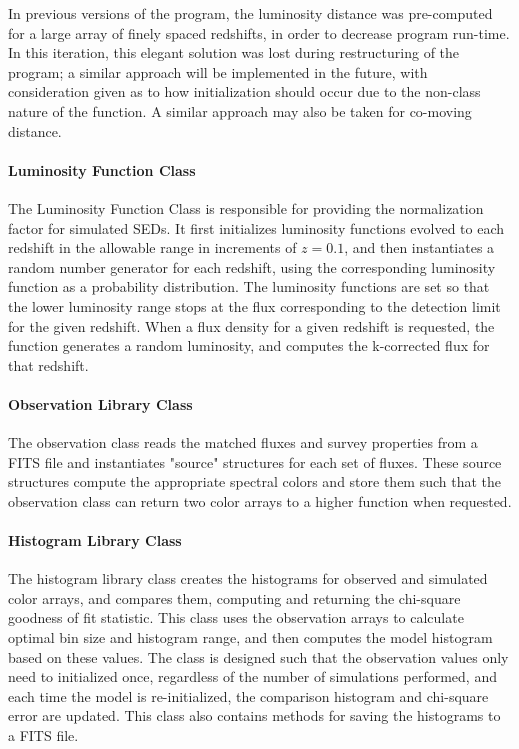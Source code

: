 \documentclass[twocolumn,letterpaper,10pt]{article}
\begin{document}
In previous versions of the program, the luminosity distance was pre-computed for a large array of finely spaced redshifts, in order to decrease program run-time. In this iteration, this elegant solution was lost during restructuring of the program; a similar approach will be implemented in the future, with consideration given as to how initialization should occur due to the non-class nature of the function. A similar approach may also be taken for co-moving distance.

\paragraph{Luminosity Function Class}
The Luminosity Function Class is responsible for providing the normalization factor for simulated SEDs. It first initializes luminosity functions evolved to each redshift in the allowable range in increments of $z=0.1$, and then instantiates a random number generator for each redshift, using the corresponding luminosity function as a probability distribution. The luminosity functions are set so that the lower luminosity range stops at the flux corresponding to the detection limit for the given redshift. When a flux density for a given redshift is requested, the function generates a random luminosity, and computes the k-corrected flux for that redshift.

\paragraph{Observation Library Class}
The observation class reads the matched fluxes and survey properties from a FITS file and instantiates "source" structures for each set of fluxes. These source structures compute the appropriate spectral colors and store them such that the observation class can return two color arrays to a higher function when requested.

\paragraph{Histogram Library Class}
The histogram library class creates the histograms for observed and simulated color arrays, and compares them, computing and returning the chi-square goodness of fit statistic. This class uses the observation arrays to calculate optimal bin size and histogram range, and then computes the model histogram based on these values. The class is designed such that the observation values only need to initialized once, regardless of the number of simulations performed, and each time the model is re-initialized, the comparison histogram and chi-square error are updated. This class also contains methods for saving the histograms to a FITS file.
\end{document}

